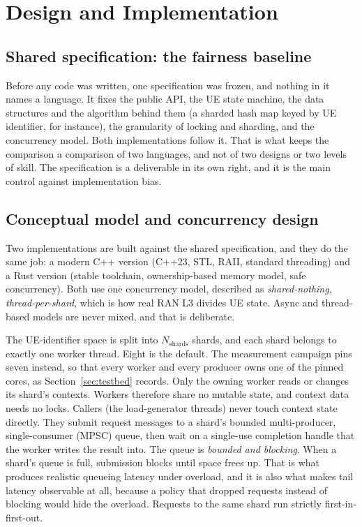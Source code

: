 \documentclass[english,oneside,a4paper,censored,csm,software-track-2020]{HYthesisML}
\begin{document}
\chapter{Design and Implementation\label{chapter:design}}

\section{Shared specification: the fairness baseline}
\label{sec:fairness}
Before any code was written, one specification was frozen, and nothing in it names a language.
It fixes the public API, the UE state machine, the data structures and the algorithm behind them
(a sharded hash map keyed by UE identifier, for instance), the granularity of locking and
sharding, and the concurrency model. Both implementations follow it. That is what keeps the
comparison a comparison of two languages, and not of two designs or two levels of skill. The
specification is a deliverable in its own right, and it is the main control against
implementation bias.

\section{Conceptual model and concurrency design}\label{sec:concurrency}
Two implementations are built against the shared specification, and they do the same job: a
modern C++ version (C++23, STL, RAII, standard threading) and a Rust version (stable toolchain,
ownership-based memory model, safe concurrency). Both use one concurrency model, described as
\emph{shared-nothing, thread-per-shard}, which is how real RAN L3 divides UE state. Async and
thread-based models are never mixed, and that is deliberate.

The UE-identifier space is split into $N_{\text{shards}}$ shards, and each shard belongs to
exactly one worker thread. Eight is the default. The measurement campaign pins seven instead, so
that every worker and every producer owns one of the pinned cores, as
Section~\ref{sec:testbed} records. Only the owning worker reads or changes its shard's contexts.
Workers therefore share no mutable state, and context data needs no locks. Callers (the
load-generator threads) never touch context state directly. They submit request messages to a
shard's bounded multi-producer, single-consumer (MPSC) queue, then wait on a single-use
completion handle that the worker writes the result into. The queue is \emph{bounded and
blocking}. When a shard's queue is full, submission blocks until space frees up. That is what
produces realistic queueing latency under overload, and it is also what makes tail latency
observable at all, because a policy that dropped requests instead of blocking would hide the
overload. Requests to the same shard run strictly first-in-first-out.
\end{document}
